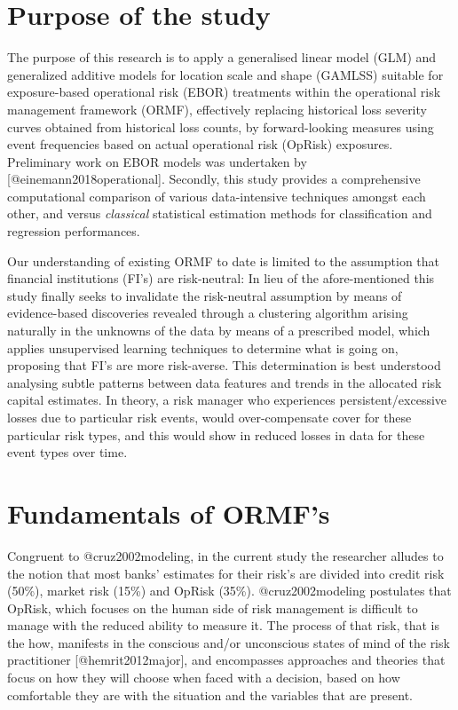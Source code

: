 \documentclass[
]{article}
\author{}
\date{\vspace{-2.5em}}
\begin{document}
\doublespacing

\section{Purpose of the study}
\label{sec:Purpose of the study}

The purpose of this research is to apply a generalised linear model
(GLM) and generalized additive models for location scale and shape
(GAMLSS) suitable for exposure-based operational risk (EBOR) treatments
within the operational risk management framework (ORMF), effectively
replacing historical loss severity curves obtained from historical loss
counts, by forward-looking measures using event frequencies based on
actual operational risk (OpRisk) exposures. Preliminary work on EBOR
models was undertaken by {[}@einemann2018operational{]}. Secondly, this
study provides a comprehensive computational comparison of various
data-intensive techniques amongst each other, and versus
\emph{classical} statistical estimation methods for classification and
regression performances.\medskip

Our understanding of existing ORMF to date is limited to the assumption
that financial institutions (FI's) are risk-neutral: In lieu of the
afore-mentioned this study finally seeks to invalidate the risk-neutral
assumption by means of evidence-based discoveries revealed through a
clustering algorithm arising naturally in the unknowns of the data by
means of a prescribed model, which applies unsupervised learning
techniques to determine what is going on, proposing that FI's are more
risk-averse. This determination is best understood analysing subtle
patterns between data features and trends in the allocated risk capital
estimates. In theory, a risk manager who experiences
persistent/excessive losses due to particular risk events, would
over-compensate cover for these particular risk types, and this would
show in reduced losses in data for these event types over time.

\section{Fundamentals of ORMF's}
\label{sec:Fundamentals of ORMF's}

Congruent to @cruz2002modeling, in the current study the researcher
alludes to the notion that most banks' estimates for their risk's are
divided into credit risk (50\%), market risk (15\%) and OpRisk (35\%).
@cruz2002modeling postulates that OpRisk, which focuses on the human
side of risk management is difficult to manage with the reduced ability
to measure it. The process of that risk, that is the how, manifests in
the conscious and/or unconscious states of mind of the risk practitioner
{[}@hemrit2012major{]}, and encompasses approaches and theories that
focus on how they will choose when faced with a decision, based on how
comfortable they are with the situation and the variables that are
present.
\end{document}

